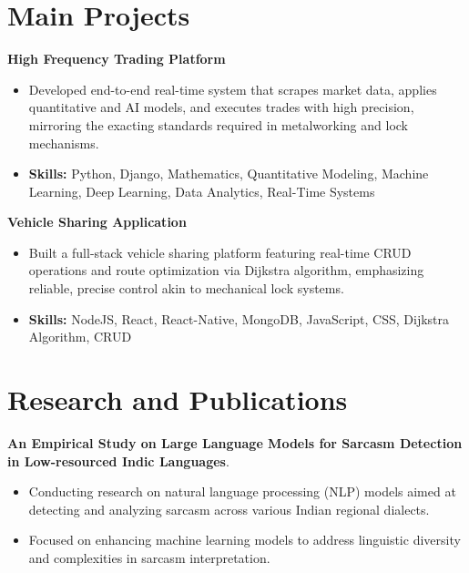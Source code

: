 \documentclass[a4paper,11pt]{article}
\begin{document}
\section{\textbf{Main Projects}}

\vspace{1mm}
  \textbf{High Frequency Trading Platform  }
\vspace{-1.5mm} %
\begin{itemize}
  \item Developed end-to-end real-time system that scrapes market data, applies quantitative and AI models, and executes trades with high precision, mirroring the exacting standards required in metalworking and lock mechanisms.
\vspace{-3mm}
  \item \textbf{Skills:} Python, Django, Mathematics, Quantitative Modeling, Machine Learning, Deep Learning, Data Analytics, Real-Time Systems
\end{itemize}


\vspace{1mm}
   \textbf{Vehicle Sharing Application }
\vspace{-1.5mm} %
\begin{itemize}
  \item Built a full-stack vehicle sharing platform featuring real-time CRUD operations and route optimization via Dijkstra algorithm, emphasizing reliable, precise control akin to mechanical lock systems.
\vspace{-3mm}
  \item \textbf{Skills:} NodeJS, React, React-Native, MongoDB, JavaScript, CSS, Dijkstra Algorithm, CRUD
\end{itemize}



\section{\textbf{Research and Publications} \hfill }
\vspace{1mm}
  \textbf{An Empirical Study on Large Language Models for Sarcasm Detection in Low-resourced Indic Languages}.
\vspace{-1mm} %
\begin{itemize}
  \item Conducting research on natural language processing (NLP) models aimed at detecting and analyzing sarcasm across various Indian regional dialects.
\vspace{-3mm}
  \item Focused on enhancing machine learning models to address linguistic diversity and complexities in sarcasm interpretation.
\end{itemize}
\end{document}
